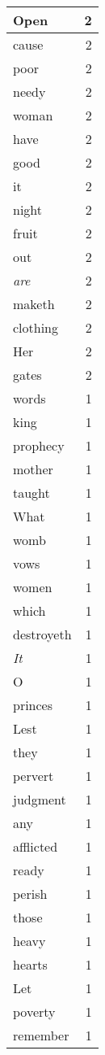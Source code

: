 \begin{center}
\begin{longtable}{l|r}
Open & 2\\ \hline 
cause & 2\\ \hline 
poor & 2\\ \hline 
needy & 2\\ \hline 
woman & 2\\ \hline 
have & 2\\ \hline 
good & 2\\ \hline 
it & 2\\ \hline 
night & 2\\ \hline 
fruit & 2\\ \hline 
out & 2\\ \hline 
\emph{are} & 2\\ \hline 
maketh & 2\\ \hline 
clothing & 2\\ \hline 
Her & 2\\ \hline 
gates & 2\\ \hline 
words & 1\\ \hline 
king & 1\\ \hline 
prophecy & 1\\ \hline 
mother & 1\\ \hline 
taught & 1\\ \hline 
What & 1\\ \hline 
womb & 1\\ \hline 
vows & 1\\ \hline 
women & 1\\ \hline 
which & 1\\ \hline 
destroyeth & 1\\ \hline 
\emph{It} & 1\\ \hline 
O & 1\\ \hline 
princes & 1\\ \hline 
Lest & 1\\ \hline 
they & 1\\ \hline 
pervert & 1\\ \hline 
judgment & 1\\ \hline 
any & 1\\ \hline 
afflicted & 1\\ \hline 
ready & 1\\ \hline 
perish & 1\\ \hline 
those & 1\\ \hline 
heavy & 1\\ \hline 
hearts & 1\\ \hline 
Let & 1\\ \hline 
poverty & 1\\ \hline 
remember & 1\\ \hline 

\end{longtable}
\end{center}
